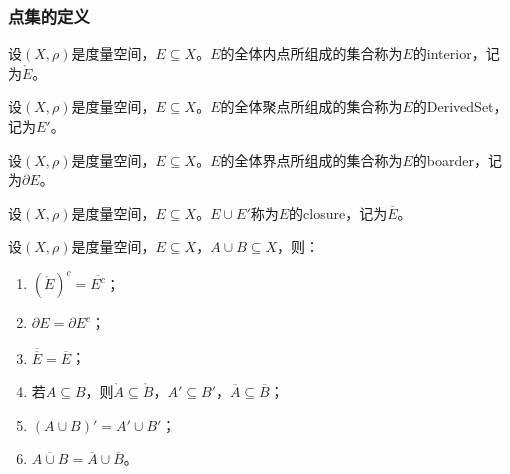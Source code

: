 \subsubsection{点集的定义}
\begin{definition}
	设$(X,\rho)$是度量空间，$E\subseteq X$。$E$的全体内点所组成的集合称为$E$的\gls{interior}，记为$\mathring{E}$。
\end{definition}
\begin{definition}
	设$(X,\rho)$是度量空间，$E\subseteq X$。$E$的全体聚点所组成的集合称为$E$的\gls{DerivedSet}，记为$E'$。
\end{definition}
\begin{definition}
	设$(X,\rho)$是度量空间，$E\subseteq X$。$E$的全体界点所组成的集合称为$E$的\gls{boarder}，记为$\partial E$。
\end{definition}
\begin{definition}
	设$(X,\rho)$是度量空间，$E\subseteq X$。$E\cup E'$称为$E$的\gls{closure}，记为$\overline{E}$。
\end{definition}
\begin{property}\label{prop:PointSet}
	设$(X,\rho)$是度量空间，$E\subseteq X$，$A\cup B\subseteq X$，则：
	\begin{enumerate}
		\item $(\mathring{E})^c=\overline{E^c}$；
		\item $\partial E = \partial E^c$；
		\item $\overline{\overline E}=\overline{E}$；
		\item 若$A\subseteq B$，则$\mathring{A}\subseteq\mathring{B}$，$A'\subseteq B'$，$\overline{A}\subseteq\overline{B}$；
		\item $(A\cup B)'=A'\cup B'$；
		\item $\overline{A\cup B}=\overline{A}\cup \overline{B}$。
	\end{enumerate}
\end{property}
